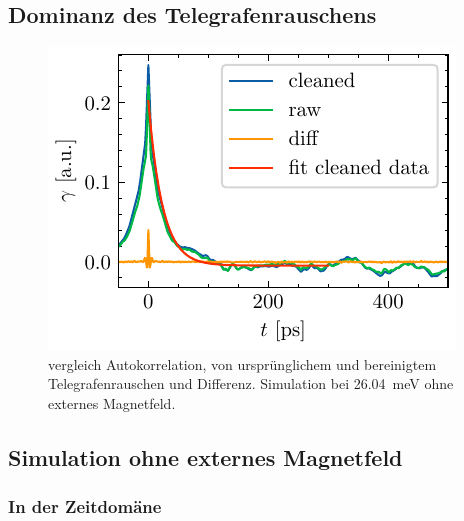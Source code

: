 \documentclass[main.tex]{subfiles}
\begin{document}


\subsection*{Dominanz des Telegrafenrauschens}



\begin{figure}[H]
    \centering
    \includegraphics{bilder/plots/Bz_0mT/autocorr_26.03meV.pdf}
    \caption{vergleich Autokorrelation, von ursprünglichem und bereinigtem Telegrafenrauschen und Differenz. Simulation bei \SI{26.04}{\milli\electronvolt} ohne externes Magnetfeld.}\label{fig:autocorr}
\end{figure}

\subsection{Simulation ohne externes Magnetfeld}
\subsubsection{In der Zeitdomäne}

\end{document}
